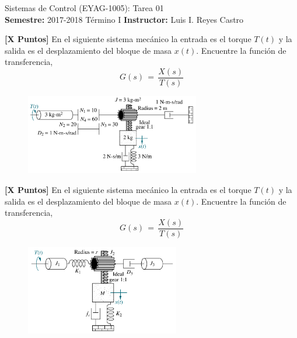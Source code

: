 \documentclass[ a4paper, twoside, 11pt]{article}
\newcommand{\numero}{01}
\begin{document}
\allowdisplaybreaks



\begin{center}
\Large Sistemas de Control (EYAG-1005): Tarea \numero \\[1ex]
\small \textbf{Semestre:} 2017-2018 T\'ermino I \qquad
\textbf{Instructor:} Luis I. Reyes Castro
\end{center}
\fullskip

%

\begin{problem}
\textbf{[X Puntos]} En el siguiente sistema mec\'anico la entrada es el torque $T(t)$ y la salida es el desplazamiento del bloque de masa $x(t)$. Encuentre la funci\'on de transferencia, \iec
\[
G(s) \, = \, 
\frac{X(s)}{T(s)}
\]
\begin{figure}[H]
\centering
\includegraphics[width=0.68\textwidth]{figures/Nise_Prob-2-40.jpg}
\end{figure}

\end{problem}
\vspace{\baselineskip}

\begin{problem}
\textbf{[X Puntos]} En el siguiente sistema mec\'anico la entrada es el torque $T(t)$ y la salida es el desplazamiento del bloque de masa $x(t)$. Encuentre la funci\'on de transferencia, \iec
\[
G(s) \, = \, 
\frac{X(s)}{T(s)}
\]
\begin{figure}[H]
\centering
\includegraphics[width=0.6\textwidth]{figures/Nise_Prob-2-41.jpg}
\end{figure}

\end{problem}
\vspace{\baselineskip}
\end{document}
